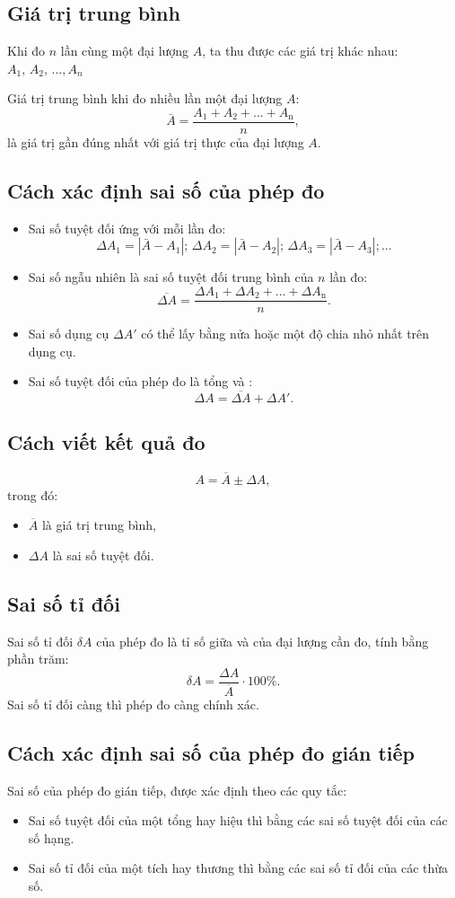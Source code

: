 \subsection{Giá trị trung bình}
Khi đo $n$ lần cùng một đại lượng $A$, ta thu được các giá trị khác nhau: $A_1,\, A_2,\,...,A_n$

Giá trị trung bình khi đo nhiều lần một đại lượng $A$:$$\bar{A}=\dfrac{A_1+A_2+...+A_{\text{n}}}{n},$$
là giá trị gần đúng nhất với giá trị thực của đại lượng $A$.  
\subsection{Cách xác định sai số của phép đo}
\begin{itemize}
	\item Sai số tuyệt đối ứng với mỗi lần đo:
	$$\Delta A_1=|\bar{A}-A_1|;\,\Delta A_2=|\bar{A}-A_2|;\,\Delta A_3=|\bar{A}-A_3|;...$$
	\item Sai số ngẫu nhiên là sai số tuyệt đối trung bình của $n$ lần đo:
	$$\overline{\Delta A}=\dfrac{\Delta A_1+\Delta A_2+...+\Delta A_{\textrm{n}} }{n}.$$
	\item Sai số dụng cụ $\Delta A'$ có thể lấy bằng nửa hoặc một độ chia nhỏ nhất trên dụng cụ.
	\item Sai số tuyệt đối của phép đo là tổng  và :
	$$\Delta A= \overline{\Delta A}+ \Delta A'.$$
\end{itemize}
\subsection{Cách viết kết quả đo}
$$A=\overline{A} \pm \Delta A,$$
trong đó:
\begin{itemize}
	\item $\overline A$ là giá trị trung bình,
	\item $\Delta A$ là sai số tuyệt đối. 
\end{itemize}
\subsection{Sai số tỉ đối}
Sai số tỉ đối $\delta A$ của phép đo là tỉ số giữa  và  của đại lượng cần đo, tính bằng phần trăm:
$$\delta A=\dfrac{\Delta A}{\overline A}\cdot 100\%.$$
Sai số tỉ đối càng  thì phép đo càng chính xác.
\subsection{Cách xác định sai số của phép đo gián tiếp}
Sai số của phép đo gián tiếp, được xác định theo các quy tắc:
\begin{itemize}
	\item Sai số tuyệt đối của một tổng hay hiệu thì bằng  các sai số tuyệt đối của các số hạng.
	\item Sai số tỉ đối của một tích hay thương thì bằng  các sai số tỉ đối của các thừa số. 
\end{itemize}
